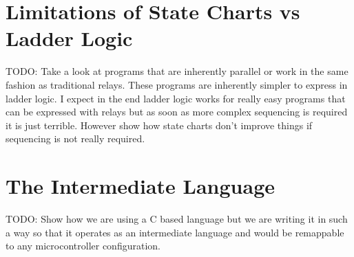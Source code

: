 \section{Limitations of State Charts vs Ladder Logic}
TODO: Take a look at programs that are inherently parallel or work in the same fashion as traditional relays. These programs are inherently simpler to express in ladder logic. I expect in the end ladder logic works for really easy programs that can be expressed with relays but as soon as more complex sequencing is required it is just terrible. However show how state charts don't improve things if sequencing is not really required.

\section{The Intermediate Language}\label{sec:IL}
TODO: Show how we are using a C based language but we are writing it in such a way so that it operates as an intermediate language and would be remappable to any microcontroller configuration.